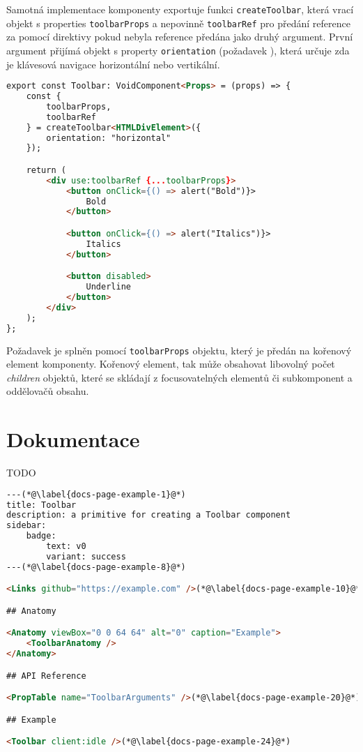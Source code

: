 Samotná implementace komponenty exportuje funkci \texttt{createToolbar}, která vrací objekt s properties \texttt{toolbarProps} a nepovinně \texttt{toolbarRef} pro předání reference za pomocí direktivy pokud nebyla reference předána jako druhý argument.
První argument přijímá objekt s property \texttt{orientation} (požadavek \hyperref[tfr12]{}), která určuje zda je klávesová navigace horizontální nebo vertikální.

\begin{lstlisting}[caption={Ukázka implementace Toolbar komponenty}, label={toolbar-example}, language=html]
export const Toolbar: VoidComponent<Props> = (props) => {
    const {
        toolbarProps,
        toolbarRef
    } = createToolbar<HTMLDivElement>({
        orientation: "horizontal"
    });

    return (
        <div use:toolbarRef {...toolbarProps}>
            <button onClick={() => alert("Bold")}>
                Bold
            </button>

            <button onClick={() => alert("Italics")}>
                Italics
            </button>

            <button disabled>
                Underline
            </button>
        </div>
    );
};
\end{lstlisting}

Požadavek \hyperref[tfr11]{} je splněn pomocí \texttt{toolbarProps} objektu, který je předán na kořenový element komponenty.
Kořenový element, tak může obsahovat libovolný počet \textit{children} objektů, které se skládají z focusovatelných elementů či subkomponent a oddělovačů obsahu.

\clearpage

\section{Dokumentace}

TODO

\begin{lstlisting}[caption={Ukázka stránky dokumentace psané v MDX}, label={docs-page-example}, language=html]
---(*@\label{docs-page-example-1}@*)
title: Toolbar
description: a primitive for creating a Toolbar component
sidebar:
    badge:
        text: v0
        variant: success
---(*@\label{docs-page-example-8}@*)

<Links github="https://example.com" />(*@\label{docs-page-example-10}@*)

## Anatomy

<Anatomy viewBox="0 0 64 64" alt="0" caption="Example">
    <ToolbarAnatomy />
</Anatomy>

## API Reference

<PropTable name="ToolbarArguments" />(*@\label{docs-page-example-20}@*)

## Example

<Toolbar client:idle />(*@\label{docs-page-example-24}@*)
\end{lstlisting}

